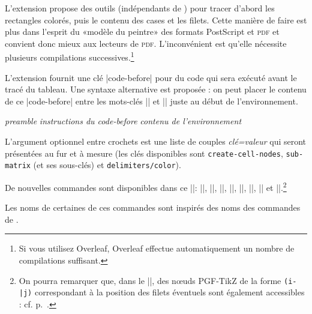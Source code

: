 \documentclass[dvipsnames]{article}%
\begin{document}
\label{color-in-code-before}

L'extension  propose des outils (indépendants de )
pour tracer d'abord les rectangles colorés, puis le contenu des cases et les
filets. Cette manière de faire est plus dans l'esprit du «modèle du peintre» des
formats PostScript et \textsc{pdf} et convient donc mieux aux lecteurs de
\textsc{pdf}. L'inconvénient est qu'elle nécessite plusieurs compilations
successives.\footnote{Si vous utilisez Overleaf, Overleaf effectue
  automatiquement un nombre de compilations suffisant.}

\medskip
L'extension  fournit une clé |code-before| pour du code qui sera
exécuté avant le tracé du tableau. Une syntaxe alternative est proposée : on
peut placer le contenu de ce |code-before| entre les mots-clés |\CodeBefore| et
|\Body| juste au début de l'environnement.

\smallskip
\begin{Code}
\begin{pNiceArray}{\textsl{preamble}}
\emph{}
  \textsl{instructions du code-before}
\emph{\Body}
  \textsl{contenu de l’environnement}
\end{pNiceArray}
\end{Code}

\smallskip
L'argument optionnel entre crochets est une liste de couples \textsl{clé=valeur}
qui seront présentées au fur et à mesure (les clés disponibles sont
  \texttt{create-cell-nodes}, \texttt{sub-matrix} (et ses sous-clés) et
  \texttt{delimiters/color}).

\smallskip
De nouvelles commandes sont disponibles dans ce |\CodeBefore|: |\cellcolor|,
|\rectanglecolor|, |\rowcolor|, |\columncolor|, |\rowcolors|, |\rowlistcolors|,
|\chessboardcolors| et |\arraycolor|.\footnote{On pourra remarquer que, dans le
  |\CodeBefore|, des nœuds PGF-TikZ de la forme \verb+(i-|j)+ correspondant à la
  position des filets éventuels sont également accessibles : cf.
  p.~\pageref{nodes-i}.}

Les noms de certaines de ces commandes sont inspirés des noms des commandes de .
\end{document}
